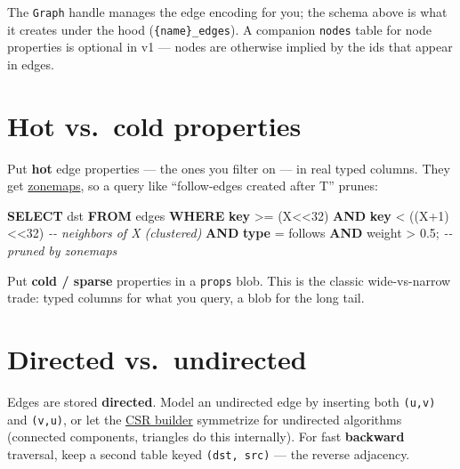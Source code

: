 \documentclass[
  11pt,
  openany]{book}
\newenvironment{Shaded}{}{}
\newcommand{\CommentTok}[1]{\textcolor[rgb]{0.38,0.63,0.69}{\textit{#1}}}
\newcommand{\DecValTok}[1]{\textcolor[rgb]{0.25,0.63,0.44}{#1}}
\newcommand{\FloatTok}[1]{\textcolor[rgb]{0.25,0.63,0.44}{#1}}
\newcommand{\KeywordTok}[1]{\textcolor[rgb]{0.00,0.44,0.13}{\textbf{#1}}}
\newcommand{\NormalTok}[1]{#1}
\newcommand{\OperatorTok}[1]{\textcolor[rgb]{0.40,0.40,0.40}{#1}}
\newcommand{\StringTok}[1]{\textcolor[rgb]{0.25,0.44,0.63}{#1}}
\begin{document}
The \texttt{Graph} handle manages the edge encoding for you; the schema
above is what it creates under the hood (\texttt{\{name\}\_edges}). A
companion \texttt{nodes} table for node properties is optional in v1 ---
nodes are otherwise implied by the ids that appear in edges.

\section{Hot vs.~cold properties}\label{hot-vs.-cold-properties}

Put \textbf{hot} edge properties --- the ones you filter on --- in real
typed columns. They get \href{../engine/storage.md}{zonemaps}, so a
query like ``follow-edges created after T'' prunes:

\begin{Shaded}
\begin{Highlighting}[]
\KeywordTok{SELECT}\NormalTok{ dst }\KeywordTok{FROM}\NormalTok{ edges}
\KeywordTok{WHERE} \KeywordTok{key} \OperatorTok{\textgreater{}=}\NormalTok{ (X}\OperatorTok{\textless{}\textless{}}\DecValTok{32}\NormalTok{) }\KeywordTok{AND} \KeywordTok{key} \OperatorTok{\textless{}}\NormalTok{ ((X}\OperatorTok{+}\DecValTok{1}\NormalTok{)}\OperatorTok{\textless{}\textless{}}\DecValTok{32}\NormalTok{)   }\CommentTok{{-}{-} neighbors of X (clustered)}
  \KeywordTok{AND} \KeywordTok{type} \OperatorTok{=} \StringTok{\textquotesingle{}follows\textquotesingle{}} \KeywordTok{AND}\NormalTok{ weight }\OperatorTok{\textgreater{}} \FloatTok{0.5}\NormalTok{;      }\CommentTok{{-}{-} pruned by zonemaps}
\end{Highlighting}
\end{Shaded}

Put \textbf{cold / sparse} properties in a \texttt{props} blob. This is
the classic wide-vs-narrow trade: typed columns for what you query, a
blob for the long tail.

\section{Directed vs.~undirected}\label{directed-vs.-undirected}

Edges are stored \textbf{directed}. Model an undirected edge by
inserting both \texttt{(u,v)} and \texttt{(v,u)}, or let the
\href{snapshot.md}{CSR builder} symmetrize for undirected algorithms
(connected components, triangles do this internally). For fast
\textbf{backward} traversal, keep a second table keyed
\texttt{(dst,\ src)} --- the reverse adjacency.
\end{document}

